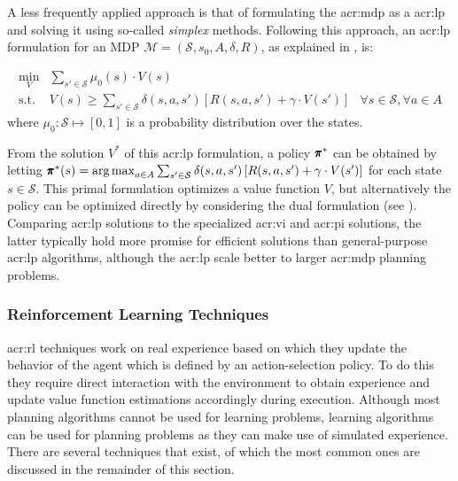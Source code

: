A less frequently applied approach is that of formulating the \acrshort{acr:mdp} as a \acrfull{acr:lp} and solving it using so-called \textit{simplex} methods.
Following this approach, an \acrshort{acr:lp} formulation for an MDP $\mathcal{M} = (\mathcal{S}, s_0, A, \delta, R)$, as explained in \cite{pazis2012non}, is:

\begin{align}
\min_{V} &\sum_{s' \in \mathcal{S}} \mu_0(s) \cdot V(s) &\nonumber\\
\text{s.t. } &V(s) \geq \sum_{s' \in \mathcal{S}} \delta(s, a, s') \left[R(s,a,s') + \gamma\cdot V(s')\right]	&\forall s \in \mathcal{S}, \forall a \in A
\end{align}
where $\mu_0: \mathcal{S} \mapsto [0,1]$ is a probability distribution over the states.

From the solution $V^*$ of this \acrshort{acr:lp} formulation, a policy $\pmb{\pi}^*$ can be obtained by letting $\pmb{\pi}^*(s) = \operatorname*{arg\,max}_{a \in A} \sum_{s' \in \mathcal{S}} \delta(s, a, s') \left[R(s,a,s') + \gamma\cdot V(s')\right]$ for each state $s \in \mathcal{S}$. This primal formulation optimizes a value function $V$, but alternatively the policy can be optimized directly by considering the dual formulation (see \cite{littman1995complexity}).
Comparing \acrshort{acr:lp} solutions to the specialized \acrshort{acr:vi} and \acrshort{acr:pi} solutions, the latter typically hold more promise for efficient solutions than general-purpose \acrshort{acr:lp} algorithms, although the \acrshort{acr:lp} scale better to larger \acrshort{acr:mdp} planning problems.

\newpage

\subsubsection{Reinforcement Learning Techniques}
\label{sec:reinforcement-learning}

\acrfull{acr:rl} techniques work on real experience based on which they update the behavior of the agent which is defined by an action-selection policy. To do this they require direct interaction with the environment to obtain experience and update value function estimations accordingly during execution.
Although most planning algorithms cannot be used for learning problems, learning algorithms can be used for planning problems as they can make use of simulated experience.
There are several techniques that exist, of which the most common ones are discussed in the remainder of this section.


